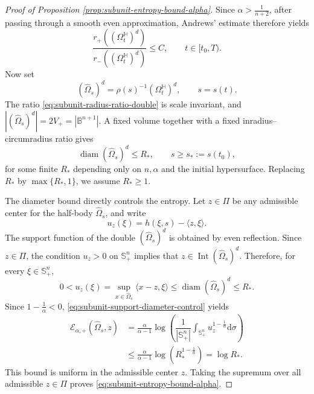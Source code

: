 \documentclass[11pt, reqno]{amsart}
\theoremstyle{remark}
\theoremstyle{definition}
\numberwithin{equation}{section}
\DeclareMathOperator{\Int}{Int}
\newcommand{\Sph}{\mathbb S}
\newcommand{\B}{\mathbb B}
\newcommand{\HH}{\mathbb H}
\newcommand{\PiH}{\Pi}
\newcommand{\cE}{\mathcal E}
\begin{document}
\begin{proof}[Proof of Proposition \ref{prop:subunit-entropy-bound-alpha}]
	Since $\alpha>\frac{1}{n+2}$, after passing through a smooth even approximation, Andrews' estimate \cite[Theorem 4]{And00} therefore yields 
	\begin{equation}\label{eq:subunit-radius-ratio-double}
		\frac{r_+((\Omega_t^{\HH})^d)}{r_-((\Omega_t^{\HH})^d)}\le  C,
		\qquad t\in[t_0,T).
	\end{equation}
	Now set
	\begin{equation*}
		(\widehat\Omega_s)^d=\rho(s)^{-1}(\Omega_t^{\HH})^d,
		\qquad s=s(t).
	\end{equation*}
	The ratio \eqref{eq:subunit-radius-ratio-double} is scale invariant, and
	$|(\widehat \Omega_s)^d|=2V_+=|\B^{n+1}|$.  A fixed volume together with a fixed inradius--circumradius ratio gives
	\begin{equation*}
		\operatorname{diam} (\widehat \Omega_s)^d\le R_*,
		\qquad s\ge s_*:=s(t_0),
	\end{equation*}
	for some finite $R_*$ depending only on $n,\alpha$ and the initial
	hypersurface.  Replacing $R_*$ by $\max\{R_*,1\}$, we assume $R_*\ge1$.
	
	The diameter bound directly controls the entropy. Let $z\in\PiH$ be any admissible center for the half-body $\widehat\Omega_s$, and write
	\begin{equation*}
		u_z(\xi)=h(\xi,s)-\langle z,\xi\rangle .
	\end{equation*}
	The support function of the double $(\widehat \Omega_s)^d$ is obtained by even reflection. Since $z\in\PiH$, the condition $u_z>0$ on $\Sph^n_+$ implies
	that $z\in\Int (\widehat \Omega_s)^d$.
    Therefore, for every $\xi\in\Sph^n_+$,
	\begin{equation}\label{eq:subunit-support-diameter-control}
		0<u_z(\xi)
		=\sup_{x\in\widehat\Omega_s}\langle x-z,\xi\rangle
		\le \operatorname{diam} (\widehat \Omega_s)^d
		\le R_* .
	\end{equation}
	Since $1-\frac1\alpha<0$, \eqref{eq:subunit-support-diameter-control} yields
	\begin{equation*}
		\begin{split}
			\cE_{\alpha,+}(\widehat\Omega_s,z)
			&=\frac{\alpha}{\alpha-1}\log\left( \dfrac{1}{|\mathbb{S}_+^n|}\int_{\mathbb{S}_+^n} u_z^{1-\frac1\alpha} \mathrm{d}\sigma  \right)  \\
			&\le \frac{\alpha}{\alpha-1}\log(R_*^{1-\frac1\alpha})
			=\log R_* .
		\end{split}
	\end{equation*}
	This bound is uniform in the admissible center $z$.  Taking the supremum over all admissible $z\in\PiH$ proves \eqref{eq:subunit-entropy-bound-alpha}.
\end{proof}
\end{document}
